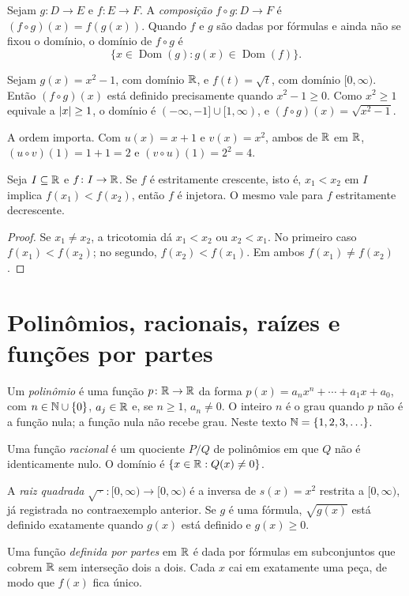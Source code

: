 \documentclass[11pt,a4paper]{article}
\begin{document}
\begin{definicao}
Sejam $g\colon D\to E$ e $f\colon E\to F$. A \emph{composição} $f\circ g\colon D\to F$ é $(f\circ g)(x)=f(g(x))$. Quando $f$ e $g$ são dadas por fórmulas e ainda não se fixou o domínio, o domínio de $f\circ g$ é
\[
\{x\in\operatorname{Dom}(g): g(x)\in\operatorname{Dom}(f)\}.
\]
\end{definicao}

\begin{exemplo}
Sejam $g(x)=x^2-1$, com domínio $\mathbb{R}$, e $f(t)=\sqrt{t}$, com domínio $[0,\infty)$. Então $(f\circ g)(x)$ está definido precisamente quando $x^2-1\ge 0$. Como $x^2\ge 1$ equivale a $\left\lvert x \right\rvert\ge 1$, o domínio é $(-\infty,-1]\cup[1,\infty)$, e $(f\circ g)(x)=\sqrt{x^2-1}$.

A ordem importa. Com $u(x)=x+1$ e $v(x)=x^2$, ambos de $\mathbb{R}$ em $\mathbb{R}$, $(u\circ v)(1)=1+1=2$ e $(v\circ u)(1)=2^2=4$.
\end{exemplo}

\begin{proposicao}\label{prop:monotonia}
Seja $I\subseteq\mathbb{R}$ e $f\colon I\to\mathbb{R}$. Se $f$ é estritamente crescente, isto é, $x_1<x_2$ em $I$ implica $f(x_1)<f(x_2)$, então $f$ é injetora. O mesmo vale para $f$ estritamente decrescente.
\end{proposicao}

\begin{proof}
Se $x_1\neq x_2$, a tricotomia dá $x_1<x_2$ ou $x_2<x_1$. No primeiro caso $f(x_1)<f(x_2)$; no segundo, $f(x_2)<f(x_1)$. Em ambos $f(x_1)\neq f(x_2)$.
\end{proof}

\section{Polinômios, racionais, raízes e funções por partes}

\begin{definicao}
Um \emph{polinômio} é uma função $p\colon\mathbb{R}\to\mathbb{R}$ da forma $p(x)=a_nx^n+\cdots+a_1x+a_0$, com $n\in\mathbb{N}\cup\{0\}$, $a_j\in\mathbb{R}$ e, se $n\ge 1$, $a_n\neq 0$. O inteiro $n$ é o grau quando $p$ não é a função nula; a função nula não recebe grau. Neste texto $\mathbb{N}=\{1,2,3,\ldots\}$.

Uma função \emph{racional} é um quociente $P/Q$ de polinômios em que $Q$ não é identicamente nulo. O domínio é $\{x\in\mathbb{R}:Q(x)\neq 0\}$.

A \emph{raiz quadrada} $\sqrt{\,\cdot\,}\colon[0,\infty)\to[0,\infty)$ é a inversa de $s(x)=x^2$ restrita a $[0,\infty)$, já registrada no contraexemplo anterior. Se $g$ é uma fórmula, $\sqrt{g(x)}$ está definido exatamente quando $g(x)$ está definido e $g(x)\ge 0$.

Uma função \emph{definida por partes} em $\mathbb{R}$ é dada por fórmulas em subconjuntos que cobrem $\mathbb{R}$ sem interseção dois a dois. Cada $x$ cai em exatamente uma peça, de modo que $f(x)$ fica único.
\end{definicao}
\end{document}
